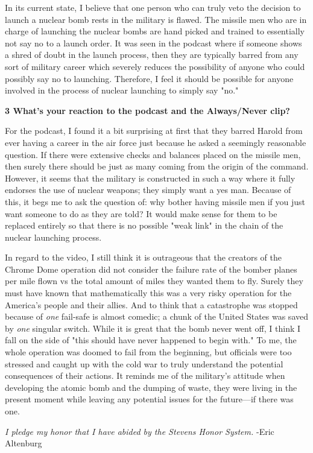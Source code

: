 \documentclass[12pt]{turabian-researchpaper}
\newcommand\question[2]{\noindent\textbf{#1 \quad #2}}
\begin{document}
	In its current state, I believe that one person who can truly veto the decision to launch a nuclear bomb rests in the military is flawed. The missile men who are in charge of launching the nuclear bombs are hand picked and trained to essentially not say no to a launch order. It was seen in the podcast where if someone shows a shred of doubt in the launch process, then they are typically barred from any sort of military career which severely reduces the possibility of anyone who could possibly say no to launching. Therefore, I feel it should be possible for anyone involved in the process of nuclear launching to simply say "no."


\question{3}{What's your reaction to the podcast and the Always/Never clip?}

	For the podcast, I found it a bit surprising at first that they barred Harold from ever having a career in the air force just because he asked a seemingly reasonable question. If there were extensive checks and balances placed on the missile men, then surely there should be just as many coming from the origin of the command. However, it seems that the military is constructed in such a way where it fully endorses the use of nuclear weapons; they simply want a yes man. Because of this, it begs me to ask the question of: why bother having missile men if you just want someone to do as they are told? It would make sense for them to be replaced entirely so that there is no possible "weak link" in the chain of the nuclear launching process.

	In regard to the video, I still think it is outrageous that the creators of the Chrome Dome operation did not consider the failure rate of the bomber planes per mile flown vs the total amount of miles they wanted them to fly. Surely they must have known that mathematically this was a very risky operation for the America's people and their allies. And to think that a catastrophe was stopped because of \textit{one} fail-safe is almost comedic; a chunk of the United States was saved by \textit{one} singular switch. While it is great that the bomb never went off, I think I fall on the side of "this should have never happened to begin with." To me, the whole operation was doomed to fail from the beginning, but officials were too stressed and caught up with the cold war to truly understand the potential consequences of their actions. It reminds me of the military's attitude when developing the atomic bomb and the dumping of waste, they were living in the present moment while leaving any potential issues for the future—if there was one.


\vspace*{\fill}
\noindent\textit{I pledge my honor that I have abided by the Stevens Honor System.} -Eric Altenburg
\end{document}
